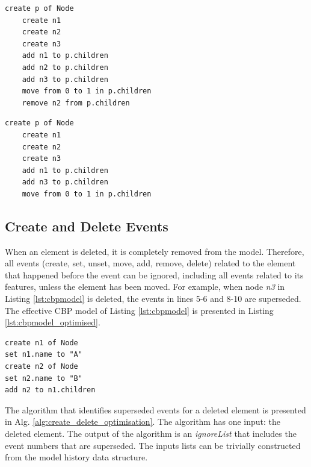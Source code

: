 \documentclass[12pt, a4paper]{report} \usepackage[titletoc]{appendix}
\begin{document}
\noindent
\begin{minipage}[t]{0.48\linewidth}
	\begin{lstlisting}[style=eol,caption={The CBP representation of reference \emph{children}'s move event.},label=lst:move_attribute_example]
	create p of Node
	create n1
	create n2
	create n3
	add n1 to p.children
	add n2 to p.children
	add n3 to p.children
	move from 0 to 1 in p.children
	remove n2 from p.children
	\end{lstlisting}
\end{minipage}
\hfill
\begin{minipage}[t]{0.48\linewidth}
	\begin{lstlisting}[style=eol,caption={The effective CBP representation of reference \emph{children}'s move event.},label=lst:move_attribute_example_error]
	create p of Node
	create n1
	create n2
	create n3
	add n1 to p.children
	add n3 to p.children
	move from 0 to 1 in p.children
	\end{lstlisting}
\end{minipage}


\subsection{Create and Delete Events}
\label{subsec:create_and_delete_operations}
When an element is deleted, it is completely removed from the model. Therefore, all events (create, set, unset, move, add, remove, delete) related to the element that happened before the event can be ignored, including all events related to its features, unless the element has been moved. For example, when node \emph{n3} in Listing \ref{lst:cbpmodel}  is deleted, the events in lines 5-6 and 8-10 are superseded. The effective CBP model of Listing \ref{lst:cbpmodel} is presented in Listing \ref{lst:cbpmodel_optimised}.

\begin{lstlisting}[style=eol,caption={Change-based representation of the model of Fig. \ref{fig:initial_model} after removal of node \emph{n5}.},label=lst:cbpmodel_optimised]
create n1 of Node
set n1.name to "A"
create n2 of Node
set n2.name to "B"
add n2 to n1.children
\end{lstlisting}

The algorithm that identifies superseded events for a deleted element is presented in Alg. \ref{alg:create_delete_optimisation}. The algorithm has one input: the deleted element. The output of the algorithm is an \emph{ignoreList} that includes the event numbers that are superseded. The inputs lists can be trivially constructed from the model history data structure.
\end{document}
